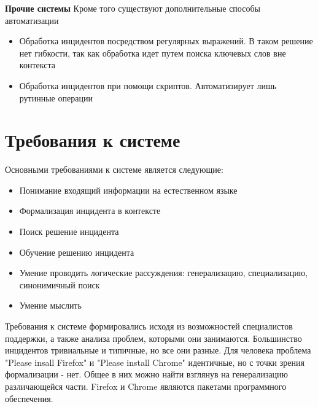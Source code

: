 \textbf{Прочие системы}
Кроме того существуют дополнительные способы автоматизации
\begin{itemize}
	\item Обработка инцидентов посредством регулярных выражений. В таком решение нет гибкости, так как обработка идет путем поиска ключевых слов вне контекста
	\item Обработка инцидентов при помощи скриптов. Автоматизирует лишь рутинные операции
\end{itemize}

\clearpage
\section{Требования к системе} \label{sect3_2}

Основными требованиями к системе является следующие:
\begin{itemize}
	\item Понимание входящий информации на естественном языке
	\item Формализация инцидента в контексте
	\item Поиск решение инцидента
	\item Обучение решению инцидента
	\item Умение проводить логические рассуждения: генерализацию, специализацию, синонимичный поиск
	\item Умение мыслить
\end{itemize}

Требования к системе формировались исходя из возможностей специалистов поддержки, а также анализа проблем, которыми они занимаются. Большинство инцидентов тривиальные и типичные, но все они разные. Для человека проблема "Please insall Firefox" и "Please install Chrome" идентичные, но с точки зрения формализации - нет. Общее в них можно найти взглянув на генерализацию различающейся части. Firefox и Chrome являются пакетами программного обеспечения.




\clearpage